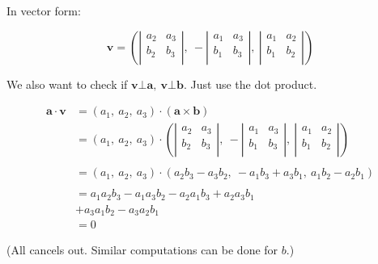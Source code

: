 \documentclass[12pt]{article}
\theoremstyle{plain}
\theoremstyle{remark}
\theoremstyle{definition}
\begin{document}
In vector form:

\[\mathbf{v} = \left( \left| \begin{matrix}
a_{2} & a_{3} \\
b_{2} & b_{3} \\
\end{matrix} \right|,\  - \left| \begin{matrix}
a_{1} & a_{3} \\
b_{1} & b_{3} \\
\end{matrix} \right|,\ \left| \begin{matrix}
a_{1} & a_{2} \\
b_{1} & b_{2} \\
\end{matrix} \right| \right)\]

We also want to check if
\(\mathbf{v}\bot\mathbf{a},\ \mathbf{v}\bot\mathbf{b}\).
Just use the dot product.

\begin{align*}
\mathbf{a} \cdot \mathbf{v} &= \left( a_{1},\ a_{2},\ a_{3} \right) \cdot \left( \mathbf{a} \times \mathbf{b} \right) \\
&= \left( a_{1},\ a_{2},\ a_{3} \right) \cdot \left( \left| \begin{matrix}a_{2} & a_{3} \\b_{2} & b_{3} \\\end{matrix} \right|,\  - \left| \begin{matrix}a_{1} & a_{3} \\b_{1} & b_{3} \\\end{matrix} \right|,\ \left| \begin{matrix}a_{1} & a_{2} \\b_{1} & b_{2} \\\end{matrix} \right| \right) \\
& \\
&= \left( a_{1},\ a_{2},\ a_{3} \right) \cdot \left( a_{2}b_{3} - a_{3}b_{2},\  - a_{1}b_{3} + a_{3}b_{1},\ a_{1}b_{2} - a_{2}b_{1} \right) \\
& \\
&= a_{1}a_{2}b_{3} - a_{1}a_{3}b_{2} - a_{2}a_{1}b_{3} + a_{2}a_{3}b_{1}  \\
&+ a_{3}a_{1}b_{2} - a_{3}a_{2}b_{1} \\
&= 0
\end{align*}


(All cancels out. Similar computations can be done for \(b\).)
\end{document}
